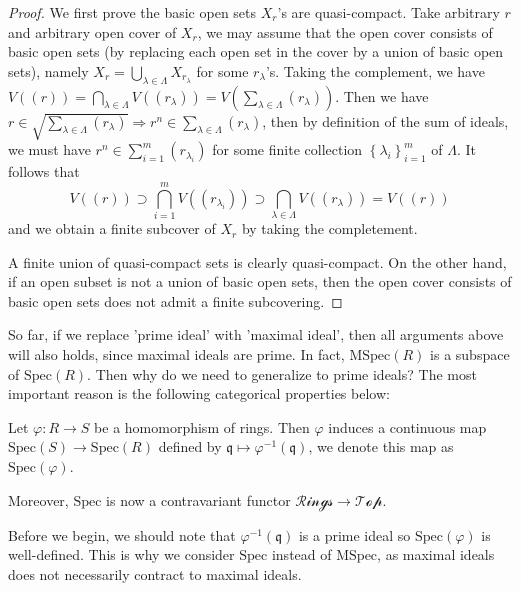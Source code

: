 \documentclass{note-eng}
\begin{document}
\begin{proof}
    We first prove the basic open sets $X_r$'s are quasi-compact. Take arbitrary $r$ and arbitrary open cover of $X_r$, we may assume that the open cover consists of basic open sets (by replacing each open set in the cover by a union of basic open sets), namely $X_r = \bigcup\limits_{\lambda \in \Lambda} X_{r_{\lambda}}$ for some $r_\lambda$'s. Taking the complement, we have $V((r)) = \bigcap\limits_{\lambda \in \Lambda} V((r_\lambda)) = V \left(\sum\limits_{\lambda \in \Lambda} (r_\lambda)\right)$. Then we have $r \in \sqrt{\sum\limits_{\lambda \in \Lambda} (r_\lambda)} \Rightarrow r^n \in \sum\limits_{\lambda \in \Lambda} (r_\lambda)$, then by definition of the sum of ideals, we must have $r^n \in \sum\limits_{i = 1}^m (r_{\lambda_i})$ for some finite collection $\left\lbrace \lambda_i \right\rbrace_{i = 1}^m$ of $\Lambda$. It follows that
    $$V((r)) \supset \bigcap\limits_{i = 1}^{m} V((r_{\lambda_i})) \supset \bigcap\limits_{\lambda \in \Lambda} V((r_\lambda)) = V((r))$$
    and we obtain a finite subcover of $X_r$ by taking the completement.

    A finite union of quasi-compact sets is clearly quasi-compact. On the other hand, if an open subset is not a union of basic open sets, then the open cover consists of basic open sets does not admit a finite subcovering.
\end{proof}

So far, if we replace 'prime ideal' with 'maximal ideal', then all arguments above will also holds, since maximal ideals are prime. In fact, $\mathrm{MSpec}(R)$ is a subspace of $\mathrm{Spec}(R)$. Then why do we need to generalize to prime ideals? The most important reason is the following categorical properties below:

\begin{proposition}\label{prop:spec-is-functor}
    Let $\varphi: R \rightarrow S$ be a homomorphism of rings. Then $\varphi$ induces a continuous map $\mathrm{Spec}(S) \rightarrow \mathrm{Spec}(R)$ defined by $\mathfrak{q} \mapsto \varphi ^{-1}(\mathfrak{q})$, we denote this map as $\mathrm{Spec}(\varphi)$.

    Moreover, $\mathrm{Spec}$ is now a contravariant functor $\mathscr{Rings} \rightarrow \mathscr{Top}$.
\end{proposition}

Before we begin, we should note that $\varphi ^{-1}(\mathfrak{q})$ is a prime ideal so $\mathrm{Spec}(\varphi)$ is well-defined. This is why we consider $\mathrm{Spec}$ instead of $\mathrm{MSpec}$, as maximal ideals does not necessarily contract to maximal ideals.
\end{document}
